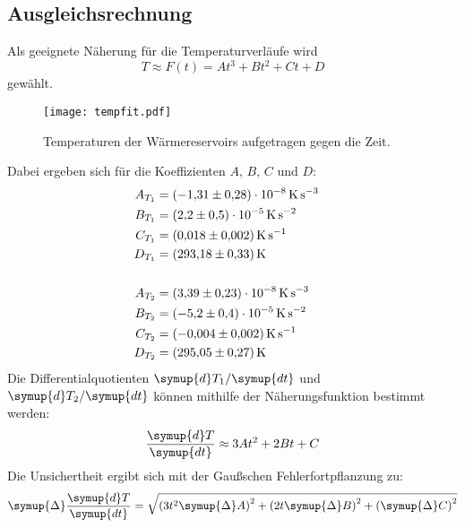 \subsection{Ausgleichsrechnung}
Als geeignete Näherung für die Temperaturverläufe wird
\begin{equation}
    T \approx F(t) = At^3 + Bt^2 + Ct + D
\end{equation}
gewählt.
\begin{figure}[H]
  \centering
  \texttt{[image: tempfit.pdf]}
  \caption{Temperaturen der Wärmereservoirs aufgetragen gegen die Zeit.}
  \label{fig:tempfit}
\end{figure}
\noindent Dabei ergeben sich für die Koeffizienten $A$, $B$, $C$ und $D$:
\begin{align*}
    A_{T_1} & = \SI[per-mode=reciprocal]{-1.31 \pm 0.28e-8}{\kelvin\per\second\cubed}&    \\
    B_{T_1} & = \SI[per-mode=reciprocal]{2.2 \pm 0.5e-5}{\kelvin\per\second\squared} &          \\
    C_{T_1} & = \SI[per-mode=reciprocal]{0.018 \pm 0.002}{\kelvin\per\second}        &               \\
    D_{T_1} & = \SI[per-mode=reciprocal]{293.18 \pm 0.33}{\kelvin}                   &    \\
\\
    A_{T_2} & = \SI[per-mode=reciprocal]{3.39 \pm 0.23e-8}{\kelvin\per\second\cubed} &   \\
    B_{T_2} & = \SI[per-mode=reciprocal]{-5.2 \pm 0.4e-5}{\kelvin\per\second\squared}&           \\
    C_{T_2} & = \SI[per-mode=reciprocal]{-0.004 \pm 0.002}{\kelvin\per\second}       &                \\
    D_{T_2} & = \SI[per-mode=reciprocal]{295.05 \pm 0.27}{\kelvin}                   &    \\
\end{align*}
Die Differentialquotienten $\symup{d}T_1/\symup{dt}$ und $\symup{d}T_2/\symup{dt}$ können mithilfe der Näherungsfunktion
bestimmt werden:
\begin{equation}
    \frac{\symup{d}T}{\symup{dt}} \approx 3At^2 + 2Bt + C
\end{equation}
Die Unsichertheit ergibt sich mit der Gaußschen Fehlerfortpflanzung zu:
\begin{equation}
    \symup{\Delta}\frac{\symup{d}T}{\symup{dt}} = \sqrt{\left(3t^2\symup{\Delta}A\right)^2+\left(2t\symup{\Delta}B\right)^2+\left(\symup{\Delta}C\right)^2}
\end{equation}
